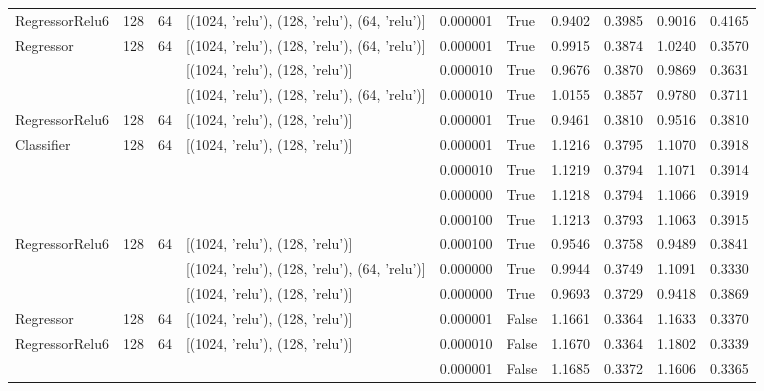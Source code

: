 \begin{table}
\begin{tabular}{llllllllll}
RegressorRelu6 & 128 & 64 & [(1024, 'relu'), (128, 'relu'), (64, 'relu')] & 0.000001 & True  &  0.9402 &      0.3985 &   0.9016 &        0.4165 \\
Regressor & 128 & 64 & [(1024, 'relu'), (128, 'relu'), (64, 'relu')] & 0.000001 & True  &  0.9915 &      0.3874 &   1.0240 &        0.3570 \\
           &     &    & [(1024, 'relu'), (128, 'relu')] & 0.000010 & True  &  0.9676 &      0.3870 &   0.9869 &        0.3631 \\
           &     &    & [(1024, 'relu'), (128, 'relu'), (64, 'relu')] & 0.000010 & True  &  1.0155 &      0.3857 &   0.9780 &        0.3711 \\
RegressorRelu6 & 128 & 64 & [(1024, 'relu'), (128, 'relu')] & 0.000001 & True  &  0.9461 &      0.3810 &   0.9516 &        0.3810 \\
Classifier & 128 & 64 & [(1024, 'relu'), (128, 'relu')] & 0.000001 & True  &  1.1216 &      0.3795 &   1.1070 &        0.3918 \\
           &     &    &                                 & 0.000010 & True  &  1.1219 &      0.3794 &   1.1071 &        0.3914 \\
           &     &    &                                 & 0.000000 & True  &  1.1218 &      0.3794 &   1.1066 &        0.3919 \\
           &     &    &                                 & 0.000100 & True  &  1.1213 &      0.3793 &   1.1063 &        0.3915 \\
RegressorRelu6 & 128 & 64 & [(1024, 'relu'), (128, 'relu')] & 0.000100 & True  &  0.9546 &      0.3758 &   0.9489 &        0.3841 \\
           &     &    & [(1024, 'relu'), (128, 'relu'), (64, 'relu')] & 0.000000 & True  &  0.9944 &      0.3749 &   1.1091 &        0.3330 \\
           &     &    & [(1024, 'relu'), (128, 'relu')] & 0.000000 & True  &  0.9693 &      0.3729 &   0.9418 &        0.3869 \\
Regressor & 128 & 64 & [(1024, 'relu'), (128, 'relu')] & 0.000001 & False &  1.1661 &      0.3364 &   1.1633 &        0.3370 \\
RegressorRelu6 & 128 & 64 & [(1024, 'relu'), (128, 'relu')] & 0.000010 & False &  1.1670 &      0.3364 &   1.1802 &        0.3339 \\
           &     &    &                                 & 0.000001 & False &  1.1685 &      0.3372 &   1.1606 &        0.3365 \\

\end{tabular}
\end{table}
